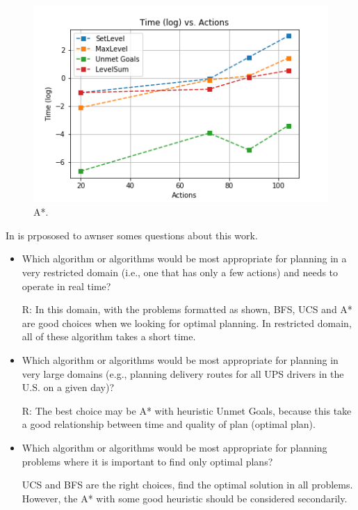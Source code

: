 \documentclass[a4paper]{article}
\begin{document}

\begin{figure}[htpb]
\begin{center}
\includegraphics[width=1\columnwidth]{fig/results_031.png}
\caption{A*.}
\end{center}
\label{fig031}
\end{figure}



In \cite{githubUdacityAINDProj2} is prpososed to awnser somes questions about this work. 

\begin{itemize}
    \item Which algorithm or algorithms would be most appropriate for planning in a very restricted domain (i.e., one that has only a few actions) and needs to operate in real time?
    
    R: In this domain, with the problems formatted as shown, BFS, UCS and A* are good choices when we looking for optimal planning. In restricted domain, all of these algorithm takes a short time.
    
    \item Which algorithm or algorithms would be most appropriate for planning in very large domains (e.g., planning delivery routes for all UPS drivers in the U.S. on a given day)?
    
    R: The best choice may be A* with heuristic Unmet Goals, because this take a good relationship between time and quality of plan (optimal plan).
    
    \item Which algorithm or algorithms would be most appropriate for planning problems where it is important to find only optimal plans?
    
    UCS and BFS are the right choices, find the optimal solution in all problems. However, the A* with some good heuristic should be considered secondarily. 
    
\end{itemize}
    
\end{document}
